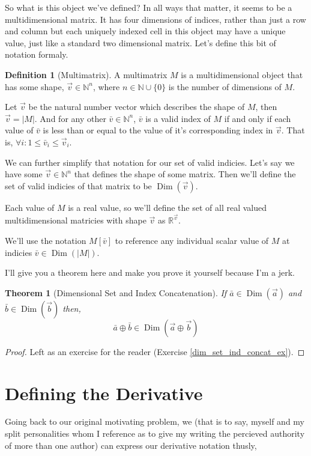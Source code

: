 \documentclass[12pt]{book}
\theoremstyle{definition}
\newtheorem{definition}{Definition}[chapter]
\theoremstyle{plain}
\newtheorem{theorem}{Theorem}[chapter]
\theoremstyle{ppart}
\theoremstyle{case}
\theoremstyle{solution}
\DeclareMathOperator{\Dim}{Dim}
\begin{document}
So what is this object we've defined? In all ways that matter, it seems to be
a multidimensional matrix. It has four dimensions of indices, rather than just
a row and column but each uniquely indexed cell in this object may have a
unique value, just like a standard two dimensional matrix. Let's define this
bit of notation formaly.

\begin{definition}[Multimatrix]
A multimatrix $M$ is a multidimensional object that has some shape,
$\vec{v} \in \mathbb{N}^n$, where $n \in \mathbb{N} \cup \{0\}$
is the number of dimensions of $M$.

Let $\vec{v}$ be the natural number vector which describes the shape of
$M$, then $\vec{v} = |M|$. And for any other $\bar{v} \in \mathbb{N}^n$, $\bar{v}$
is a valid index of $M$ if and only if each value of $\bar{v}$ is less than or equal
to the value of it's corresponding index in $\vec{v}$.
That is, $\forall i: 1 \le \bar{v}_i \le \vec{v}_i$.

We can further simplify that notation for our set of valid indicies. Let's say we have
some $\vec{v} \in \mathbb{N}^n$ that defines the shape of some matrix. Then we'll
define the set of valid indicies of that matrix to be $\Dim(\vec{v})$. 

Each value of $M$ is a real value, so we'll define the set of all real valued
multidimensional matricies with shape $\vec{v}$ as $\mathbb{R}^{\vec{v}}$.

We'll use the notation $M[\bar{v}]$ to reference any individual scalar value of $M$
at indicies $\bar{v} \in \Dim(|M|)$. 
\end{definition}

I'll give you a theorem here and make you prove it yourself because I'm a jerk.
\begin{theorem}[Dimensional Set and Index Concatenation]
\label{dim_set_ind_concat_thm}
If $\bar{a} \in \Dim(\vec{a})$ and $\bar{b} \in \Dim(\vec{b})$ then,
\[ \bar{a} \oplus \bar{b} \in \Dim(\vec{a} \oplus \vec{b}) \]
\end{theorem}
\begin{proof}
Left as an exercise for the reader (Exercise \ref{dim_set_ind_concat_ex}).
\end{proof}

\section{Defining the Derivative}

Going back to our original motivating problem, we (that is to say, myself and my
split personalities whom I reference as to give my writing the percieved authority
of more than one author) can express our derivative notation thusly,
\end{document}
